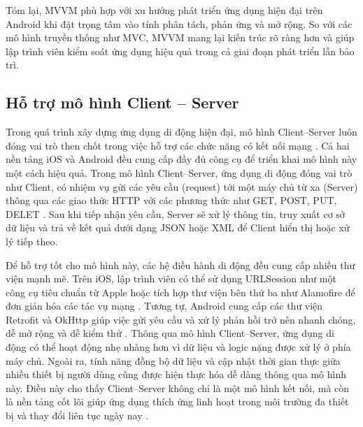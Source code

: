    \begin{flushleft}
        \hspace*{0.8cm}Tóm lại, MVVM phù hợp với xu hướng phát triển ứng dụng hiện đại trên Android khi đặt trọng tâm vào tính phân tách, phản ứng và mở rộng. So với các mô hình truyền thống như MVC, MVVM mang lại kiến trúc rõ ràng hơn và giúp lập trình viên kiểm soát ứng dụng hiệu quả trong cả giai đoạn phát triển lẫn bảo trì.
    \end{flushleft}

\subsection{Hỗ trợ mô hình Client – Server}
\renewcommand{\labelitemi}{--}    
    \begin{flushleft}
        \hspace*{0.8cm}Trong quá trình xây dựng ứng dụng di động hiện đại, mô hình Client–Server luôn đóng vai trò then chốt trong việc hỗ trợ các chức năng có kết nối mạng \cite{client_server_model}. Cả hai nền tảng iOS và Android đều cung cấp đầy đủ công cụ để triển khai mô hình này một cách hiệu quả. Trong mô hình Client–Server, ứng dụng di động đóng vai trò như Client, có nhiệm vụ gửi các yêu cầu (request) tới một máy chủ từ xa (Server) thông qua các giao thức HTTP với các phương thức như GET, POST, PUT, DELET \cite{http_methods}. Sau khi tiếp nhận yêu cầu, Server sẽ xử lý thông tin, truy xuất cơ sở dữ liệu và trả về kết quả dưới dạng JSON hoặc XML để Client hiển thị hoặc xử lý tiếp theo.
    \end{flushleft}

    \begin{flushleft}
      \hspace*{0.8cm}Để hỗ trợ tốt cho mô hình này, các hệ điều hành di động đều cung cấp nhiều thư viện mạnh mẽ. Trên iOS, lập trình viên có thể sử dụng URLSession như một công cụ tiêu chuẩn từ Apple hoặc tích hợp thư viện bên thứ ba như Alamofire để đơn giản hóa các tác vụ mạng \cite{alamofire}. Tương tự, Android cung cấp các thư viện Retrofit và OkHttp giúp việc gửi yêu cầu và xử lý phản hồi trở nên nhanh chóng, dễ mở rộng và dễ kiểm thử \cite{retrofit_okhttp}. Thông qua mô hình Client–Server, ứng dụng di động có thể hoạt động nhẹ nhàng hơn vì dữ liệu và logic nặng được xử lý ở phía máy chủ. Ngoài ra, tính năng đồng bộ dữ liệu và cập nhật thời gian thực giữa nhiều thiết bị người dùng cũng được hiện thực hóa dễ dàng thông qua mô hình này. Điều này cho thấy Client–Server không chỉ là một mô hình kết nối, mà còn là nền tảng cốt lõi giúp ứng dụng thích ứng linh hoạt trong môi trường đa thiết bị và thay đổi liên tục ngày nay \cite{scalable_mobile_arch}.
    \end{flushleft}

